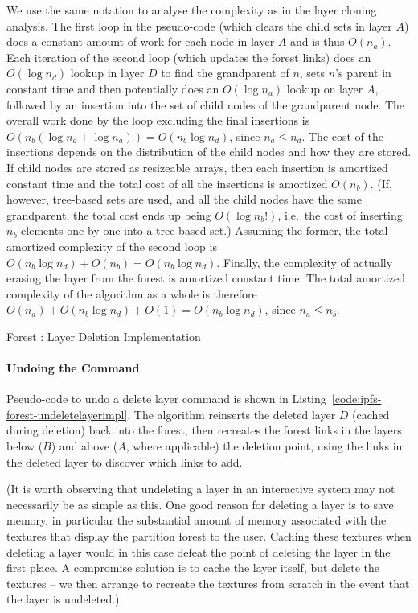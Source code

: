 We use the same notation to analyse the complexity as in the layer cloning analysis. The first loop in the pseudo-code (which clears the child sets in layer $A$) does a constant amount of work for each node in layer $A$ and is thus $O(n_a)$. Each iteration of the second loop (which updates the forest links) does an $O(\log n_d)$ lookup in layer $D$ to find the grandparent of $n$, sets $n$'s parent in constant time and then potentially does an $O(\log n_a)$ lookup on layer $A$, followed by an insertion into the set of child nodes of the grandparent node. The overall work done by the loop excluding the final insertions is $O(n_b (\log n_d + \log n_a)) = O(n_b \log n_d)$, since $n_a \le n_d$. The cost of the insertions depends on the distribution of the child nodes and how they are stored. If child nodes are stored as resizeable arrays, then each insertion is amortized constant time and the total cost of all the insertions is amortized $O(n_b)$. (If, however, tree-based sets are used, and all the child nodes have the same grandparent, the total cost ends up being $O(\log n_b!)$, i.e.~the cost of inserting $n_b$ elements one by one into a tree-based set.) Assuming the former, the total amortized complexity of the second loop is $O(n_b \log n_d) + O(n_b) = O(n_b \log n_d)$. Finally, the complexity of actually erasing the layer from the forest is amortized constant time. The total amortized complexity of the algorithm as a whole is therefore $O(n_a) + O(n_b \log n_d) + O(1) = O(n_b \log n_d)$, since $n_a \le n_b$.

\begin{stulisting}[p]
\caption{Forest : Layer Deletion Implementation}
\label{code:ipfs-forest-deletelayerimpl}

\end{stulisting}

\paragraph{Undoing the Command}

Pseudo-code to undo a delete layer command is shown in Listing~\ref{code:ipfs-forest-undeletelayerimpl}. The algorithm reinserts the deleted layer $D$ (cached during deletion) back into the forest, then recreates the forest links in the layers below ($B$) and above ($A$, where applicable) the deletion point, using the links in the deleted layer to discover which links to add.

(It is worth observing that undeleting a layer in an interactive system may not necessarily be as simple as this. One good reason for deleting a layer is to save memory, in particular the substantial amount of memory associated with the textures that display the partition forest to the user. Caching these textures when deleting a layer would in this case defeat the point of deleting the layer in the first place. A compromise solution is to cache the layer itself, but delete the textures -- we then arrange to recreate the textures from scratch in the event that the layer is undeleted.)

